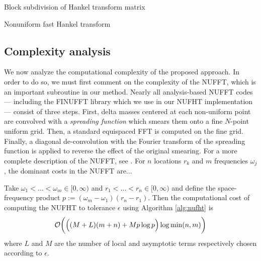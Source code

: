 \begin{algorithm2e}[t]
    \caption{Block subdivision of Hankel transform
    matrix}\label{alg:subdivision}
    
\end{algorithm2e}

\begin{algorithm2e}[t]
    \caption{Nonuniform fast Hankel transform}\label{alg:nufht}
    
\end{algorithm2e}

\subsection{Complexity analysis}

We now analyze the computational complexity of the proposed approach. In order
to do so, we must first comment on the complexity of the NUFFT, which is an
important subroutine in our method. Nearly all analysis-based NUFFT codes ---
including the FINUFFT library \cite{barnett2019parallel} which we use in our
NUFHT implementation --- consist of three steps. First, delta masses centered at
each non-uniform point are convolved with a \textit{spreading function} which
smears them onto a fine $N$-point uniform grid. Then, a standard equispaced FFT
is computed on the fine grid. Finally, a diagonal de-convolution with the
Fourier transform of the spreading function is applied to reverse the effect of
the original smearing. For a more complete description of the NUFFT, see
\todocite. For $n$ locations $r_k$ and $m$ frequencies $\omega_j$, the dominant
costs in the NUFFT are... 

\begin{theorem}
    Take $\omega_1 < \dots < \omega_m \in [0,\infty)$ and $r_1 < \dots < r_n \in
    [0,\infty)$ and define the space-frequency product $p := (\omega_m -
    \omega_1)(r_n - r_1)$. Then the computational cost of computing the NUFHT to
    tolerance $\epsilon$ using Algorithm \ref{alg:nufht} is 
    $$\mathcal{O}\bigg(\Big((M + L)(m + n) + Mp\log p\Big) \log \min(n,m) \bigg)$$ where
    $L$ and $M$ are the number of local and asymptotic terms respectively chosen
    according to $\epsilon$.
\end{theorem}

